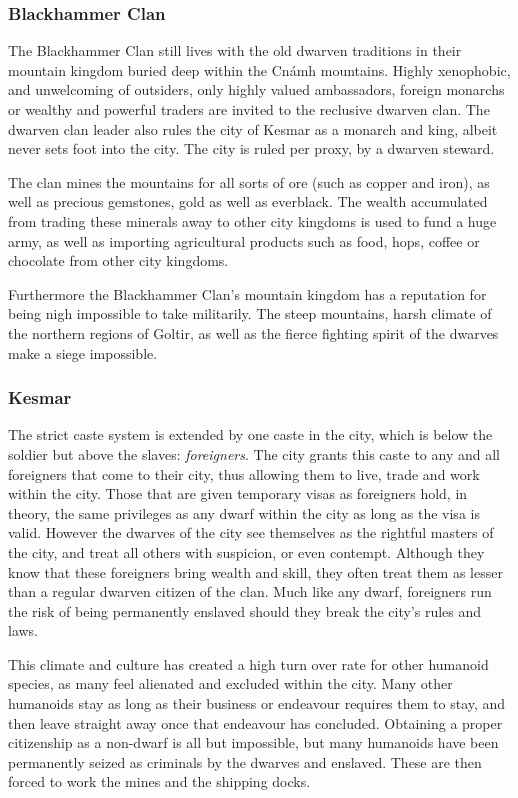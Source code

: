 \subsubsection{Blackhammer Clan}

The Blackhammer Clan still lives with the old dwarven traditions in their
mountain kingdom buried deep within the Cnámh mountains. Highly xenophobic,
and unwelcoming of outsiders, only highly valued ambassadors, foreign monarchs
or wealthy and powerful traders are invited to the reclusive dwarven clan. The
dwarven clan leader also rules the city of Kesmar as a monarch and king,
albeit never sets foot into the city. The city is ruled per proxy, by a
dwarven steward.

The clan mines the mountains for all sorts of ore (such as copper and iron),
as well as precious gemstones, gold as well as everblack. The wealth
accumulated from trading these minerals away to other city kingdoms is used to
fund a huge army, as well as importing agricultural products such as food,
hops, coffee or chocolate from other city kingdoms.

Furthermore the Blackhammer Clan's mountain kingdom has a reputation for being
nigh impossible to take militarily. The steep mountains, harsh climate of the
northern regions of Goltir, as well as the fierce fighting spirit of the dwarves
make a siege impossible.

\subsubsection{Kesmar}

The strict caste system is extended by one caste in the city, which is below
the soldier but above the slaves: \emph{foreigners}. The city grants this
caste to any and all foreigners that come to their city, thus allowing them to
live, trade and work within the city. Those that are given temporary visas as
foreigners hold, in theory, the same privileges as any dwarf within the city
as long as the visa is valid. However the dwarves of the city see themselves
as the rightful masters of the city, and treat all others with suspicion, or
even contempt. Although they know that these foreigners bring wealth and skill,
they often treat them as lesser than a regular dwarven citizen of the clan.
Much like any dwarf, foreigners run the risk of being permanently enslaved
should they break the city's rules and laws.

This climate and culture has created a high turn over rate for other humanoid
species, as many feel alienated and excluded within the city. Many other
humanoids stay as long as their business or endeavour requires them to stay,
and then leave straight away once that endeavour has concluded. Obtaining a
proper citizenship as a non-dwarf is all but impossible, but many humanoids
have been permanently seized as criminals by the dwarves and enslaved. These
are then forced to work the mines and the shipping docks.

